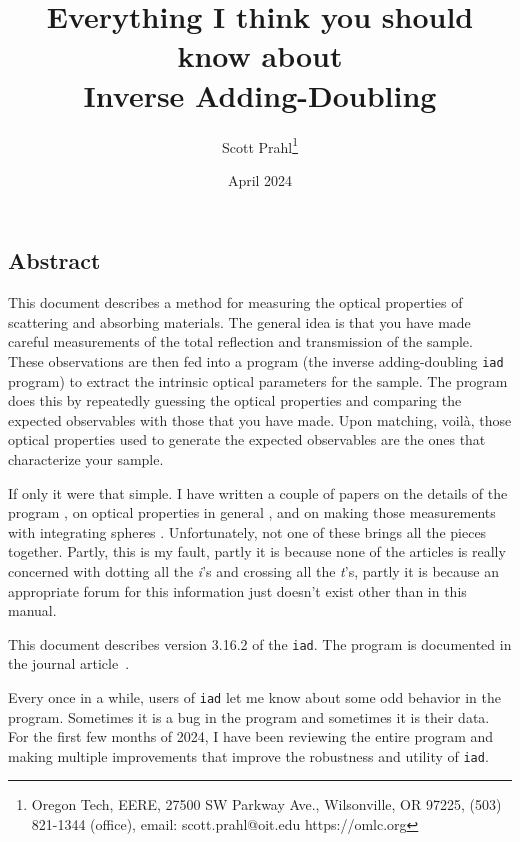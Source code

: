 \documentclass{article}
\newcommand\iadprog{\texttt{iad}}
\begin{document}
\title{Everything I think you should know about \\
Inverse Adding-Doubling}
\author{
Scott Prahl\thanks{Oregon Tech,
                   EERE,
                   27500 SW Parkway Ave.,
                   Wilsonville, OR 97225,
                   (503) 821-1344 (office),
                   email: scott.prahl@oit.edu
                   https://omlc.org}
}
\date{April 2024}	

\maketitle

\subsection*{Abstract}  
This document describes a method for measuring the optical properties of
scattering and absorbing materials.  The general idea is that you have made 
careful measurements of the total reflection and transmission of the sample.  
These observations are then fed into
a program (the inverse adding-doubling \iadprog{} program) to extract the intrinsic
optical parameters for the sample.   The program does this by repeatedly guessing
the optical properties and comparing the expected observables with those that you
have made.  Upon matching, voil\`a, those optical properties used to generate the
expected observables are the ones that characterize your sample.

If only it were that simple.  I have written a couple of papers on the details of
the program \cite{jacques87a,prahl93a,moffitt06a}, on optical properties in general
\cite{cheong90a}, and on making those measurements with integrating spheres
\cite{pickering92,pickering93a}.  Unfortunately, not one of these brings all the
pieces together.  Partly, this is my fault, partly it is because none of the
articles is really concerned with dotting all the \textit{i}'s and crossing all
the \textit{t}'s, partly it is because an appropriate forum for this information
just doesn't exist other than in this manual.

This document describes version 3.16.2 of the \iadprog{}.  The program is documented in the
journal article~\cite{moffitt07a}.

Every once in a while, users of \iadprog{} let me know about some odd behavior in 
the program.  Sometimes it is a bug in the program and sometimes it is their data.
For the first few months of 2024, I have been reviewing the entire program and
making multiple improvements that improve the robustness and utility of \iadprog{}.
\end{document}
